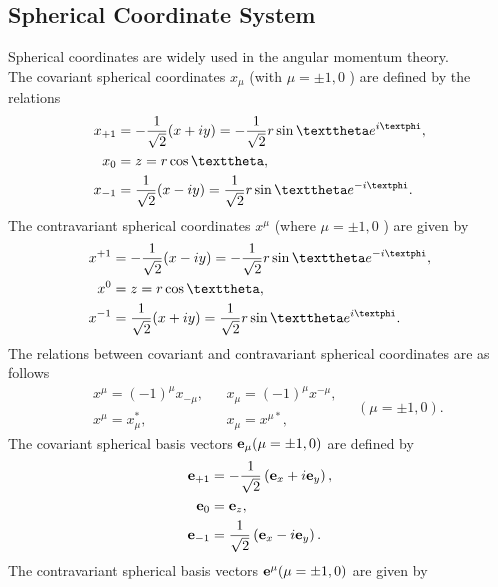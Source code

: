 \subsection{Spherical Coordinate System}\label{sec:1.1.3}
Spherical coordinates are widely used in the angular momentum theory.\\
The covariant spherical coordinates \(x_{\mu}\) (with \(\mu= \pm 1,0\) ) are defined by the relations
\begin{align}
x_{+1} & =-\frac{1}{\sqrt{2}}(x+i y)=-\frac{1}{\sqrt{2}} r \sin \vartheta e^{i \varphi},  \notag\\
x_{0} & =z=r \cos \vartheta , \label{eq:1:1:17}\\
x_{-1} & =\frac{1}{\sqrt{2}}(x-i y)=\frac{1}{\sqrt{2}} r \sin \vartheta e^{-i \varphi}. \notag
\end{align}
The contravariant spherical coordinates \(x^{\mu}\) (where \(\mu= \pm 1,0\) ) are given by
\begin{align}
x^{+1} & =-\frac{1}{\sqrt{2}}(x-i y)=-\frac{1}{\sqrt{2}} r \sin \vartheta e^{-i \varphi} , \notag\\
x^{0} & =z=r \cos \vartheta , \label{eq:1:1:18}\\
x^{-1} & =\frac{1}{\sqrt{2}}(x+i y)=\frac{1}{\sqrt{2}} r \sin \vartheta e^{i \varphi} .\notag
\end{align}
The relations between covariant and contravariant spherical coordinates are as follows
\begin{equation}
\begin{aligned}
&x^{\mu}=(-1)^{\mu} x_{-\mu}, & & x_{\mu}=(-1)^{\mu} x^{-\mu}, \\
&x^{\mu}=x_{\mu}^{*}, & & x_{\mu}=x^{\mu *}, 
\end{aligned} \quad(\mu= \pm 1,0) .\label{eq:1:1:19}
\end{equation}
The covariant spherical basis vectors \(\mathbf{e}_{\mu}(\mu= \pm 1,0)\) are defined by
\begin{align}
\mathbf{e}_{+1} & =-\frac{1}{\sqrt{2}}\left(\mathbf{e}_{x}+i \mathbf{e}_{y}\right),  \notag\\
\mathbf{e}_{0} & =\mathbf{e}_{z},  \label{eq:1:1:20}\\
\mathbf{e}_{-1} & =\frac{1}{\sqrt{2}}\left(\mathbf{e}_{x}-i \mathbf{e}_{y}\right) . \notag
\end{align}
The contravariant spherical basis vectors \(\mathbf{e}^{\mu}(\mu= \pm 1,0)\) are given by
